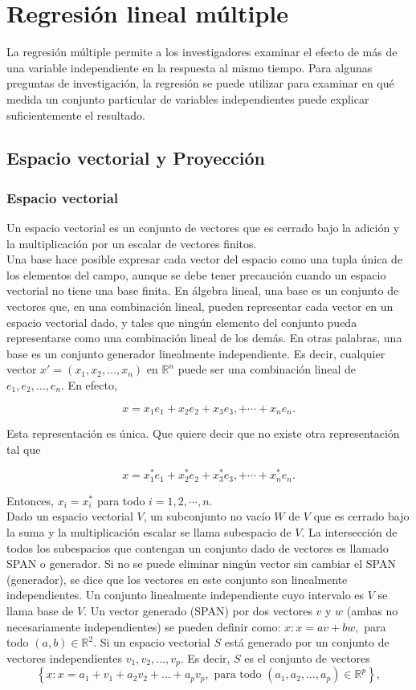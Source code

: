 \chapter{Regresión lineal múltiple}
La regresión múltiple permite a los investigadores examinar el efecto de más de una variable independiente en la respuesta al mismo tiempo. Para algunas preguntas de investigación, la regresión se puede utilizar para examinar en qué medida un conjunto particular de variables independientes puede explicar suficientemente el resultado.

\section{Espacio vectorial y Proyección}

\subsection{Espacio vectorial}
Un espacio vectorial es un conjunto de vectores  que es cerrado bajo  la adición y la multiplicación por un escalar de vectores finitos.\\

Una base hace posible expresar cada vector del espacio como una tupla única de los elementos del campo, aunque se debe tener precaución cuando un espacio vectorial no tiene una base finita. En álgebra lineal, una base es un conjunto de vectores que, en una combinación lineal, pueden representar cada vector en un espacio vectorial dado, y tales que ningún elemento del conjunto pueda representarse como una combinación lineal de los demás. En otras palabras, una base es un conjunto generador linealmente independiente. Es decir, cualquier vector $x'=(x_1,x_2,\ldots,x_n)$ en $\mathbb{R}^n$ puede ser una combinación lineal de $e_1,e_2,\ldots,e_n$. En efecto,

$$x=x_1e_1+x_2e_2+x_3e_3,+\cdots+x_ne_n.$$

Esta representación es única. Que quiere decir que no existe otra representación tal que

$$x=x_1^*e_1+x_2^*e_2+x_3^*e_3,+\cdots+x_n^*e_n.$$

Entonces, $x_i=x_i^*$ para todo $i=1,2,\cdots , n.$\\ 

Dado un espacio vectorial $V$, un subconjunto no vacío $W$ de $V$ que es cerrado bajo la suma y la multiplicación escalar se llama subespacio de $V$. La intersección de todos los subespacios que contengan un conjunto dado de vectores es llamado SPAN o generador. Si no se puede eliminar ningún vector sin cambiar el SPAN (generador), se dice que los vectores en este conjunto son linealmente independientes. Un conjunto linealmente independiente cuyo intervalo es $V$ se llama base de $V$. Un vector generado (SPAN) por dos vectores $v$ y $w$ (ambas no necesariamente independientes) se pueden definir como: $x:x=av+bw,$ para todo $(a,b)\in \mathbb{R}^2$. Si un espacio vectorial $S$ está generado por un conjunto de vectores independientes $v_1,v_2,\ldots , v_p$. Es decir, $S$ es el conjunto de vectores 
$$\left\{x:x=a_1+v_1+a_2v_2+\ldots+a_pv_p,\mbox{ para todo } (a_1,a_2,\ldots,a_p)\in \mathbb{R}^p\right\},$$

